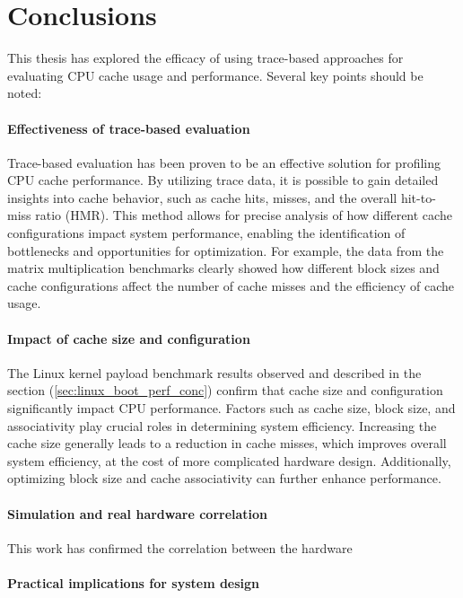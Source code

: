 
\chapter{Conclusions}

This thesis has explored the efficacy of using trace-based approaches for evaluating CPU cache usage and performance. Several key points should be noted:

\subsubsection*{Effectiveness of trace-based evaluation}

Trace-based evaluation has been proven to be an effective solution for profiling CPU cache performance.
By utilizing trace data, it is possible to gain detailed insights into cache behavior, such as cache hits, misses, and the overall hit-to-miss ratio (HMR). This method allows
for precise analysis of how different cache configurations impact system performance, enabling the identification of bottlenecks and opportunities for optimization.
For example, the data from the matrix multiplication benchmarks clearly showed how different block sizes and cache configurations affect the number of cache misses and the
efficiency of cache usage.

\subsubsection*{Impact of cache size and configuration}

The Linux kernel payload benchmark results observed and described in the section (\ref{sec:linux_boot_perf_conc}) confirm that cache size and configuration significantly impact CPU
performance. Factors such as cache size, block size, and associativity play crucial roles in determining system efficiency. Increasing the cache size generally leads to a reduction
in cache misses, which improves overall system efficiency, at the cost of more complicated hardware design. Additionally, optimizing block size and cache associativity can
further enhance performance.


\subsubsection*{Simulation and real hardware correlation}

This work has confirmed the correlation between the hardware 

\subsubsection*{Practical implications for system design}

